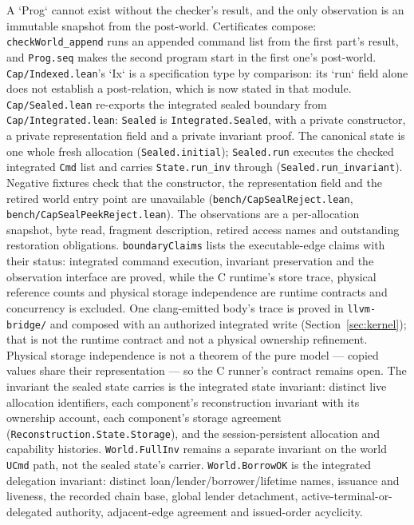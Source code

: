 \documentclass[10pt,a4paper]{article}
\newcommand{\file}[1]{\texttt{\small #1}}
\begin{document}
A `Prog` cannot exist without the checker's result, and the only observation is an
immutable snapshot from the post-world. Certificates compose: \texttt{checkWorld\_append}
runs an appended command list from the first part's result, and \texttt{Prog.seq} makes
the second program start in the first one's post-world. \texttt{Cap/Indexed.lean}'s `Ix` is a
specification type by comparison: its `run` field alone does not establish a
post-relation, which is now stated in that module. \file{Cap/Sealed.lean} re-exports the integrated sealed boundary from
\file{Cap/Integrated.lean}: \texttt{Sealed} is \texttt{Integrated.Sealed}, with a
private constructor, a private representation field and a private invariant
proof. The canonical state is one whole fresh allocation
(\texttt{Sealed.initial}); \texttt{Sealed.run} executes the checked integrated
\texttt{Cmd} list and carries \texttt{State.run\_inv} through
(\texttt{Sealed.run\_invariant}). Negative fixtures check that the constructor,
the representation field and the retired world entry point are unavailable
(\texttt{bench/CapSealReject.lean}, \texttt{bench/CapSealPeekReject.lean}). The
observations are a per-allocation snapshot, byte read, fragment description,
retired access names and outstanding restoration obligations.
\texttt{boundaryClaims} lists the executable-edge claims with their status:
integrated command execution, invariant preservation and the observation
interface are proved, while the C runtime's store trace, physical reference
counts and physical storage independence are runtime contracts and concurrency is
excluded. One clang-emitted body's trace is proved in \file{llvm-bridge/} and
composed with an authorized integrated write (Section~\ref{sec:kernel}); that is
not the runtime contract and not a physical ownership refinement.
Physical storage independence is not a theorem of the pure model --- copied
values share their representation --- so the C runner's contract remains open.
The invariant the sealed state
carries is the integrated state invariant: distinct live allocation identifiers,
each component's reconstruction invariant with its ownership account, each
component's storage agreement
(\texttt{Reconstruction.State.Storage}), and the session-persistent allocation
and capability histories. \texttt{World.FullInv} remains a
separate invariant on the world \texttt{UCmd} path, not the sealed state's
carrier.
\texttt{World.BorrowOK} is the integrated delegation invariant: distinct
loan/lender/borrower/lifetime names, issuance and liveness, the recorded chain
base, global lender detachment, active-terminal-or-delegated authority,
adjacent-edge agreement and issued-order acyclicity.
\end{document}
